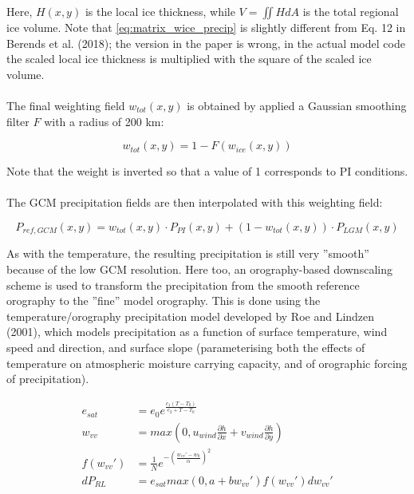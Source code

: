 \documentclass{article}
\begin{document}
Here, $H(x,y)$ is the local ice thickness, while $V = \iint H dA$ is the total regional ice volume. Note that \eqref{eq:matrix_wice_precip} is slightly different from Eq. 12 in Berends et al. (2018); the version in the paper is wrong, in the actual model code the scaled local ice thickness is multiplied with the square of the scaled ice volume.\\
\\
The final weighting field $w_{tot}(x,y)$ is obtained by applied a Gaussian smoothing filter $F$ with a radius of 200 km:

\begin{equation}
w_{tot} (x,y) = 1 - F( w_{ice} (x,y) )
\end{equation}

Note that the weight is inverted so that a value of 1 corresponds to PI conditions.\\
\\
The GCM precipitation fields are then interpolated with this weighting field:

\begin{equation}
P_{ref,GCM} (x,y) = w_{tot} (x,y) \cdot P_{PI} (x,y) + \left( 1 - w_{tot} (x,y) \right) \cdot P_{LGM} (x,y)
\end{equation}

As with the temperature, the resulting precipitation is still very ''smooth'' because of the low GCM resolution. Here too, an orography-based downscaling scheme is used to transform the precipitation from the smooth reference orography to the ''fine'' model orography. This is done using the temperature/orography precipitation model developed by Roe and Lindzen (2001), which models precipitation as a function of surface temperature, wind speed and direction, and surface slope (parameterising both the effects of temperature on atmospheric moisture carrying capacity, and of orographic forcing of precipitation).

\begin{align}
e_{sat} &= e_0 e^{\frac{c_1 (T - T_0)}{c_2 + T - T_0}} \\
w_{vv} &= max(0, u_{wind} \frac{\partial h}{\partial x} + v_{wind} \frac{\partial h}{\partial y}) \\
f( w_{vv}') &= \frac{1}{N} e^{-{\left( \frac{w_{vv}' - w_0}{\alpha} \right)}^2}\\
dP_{RL} &= e_{sat} max(0, a+b w_{vv}') f( w_{vv}') dw_{vv}'
\end{align}
\end{document}
